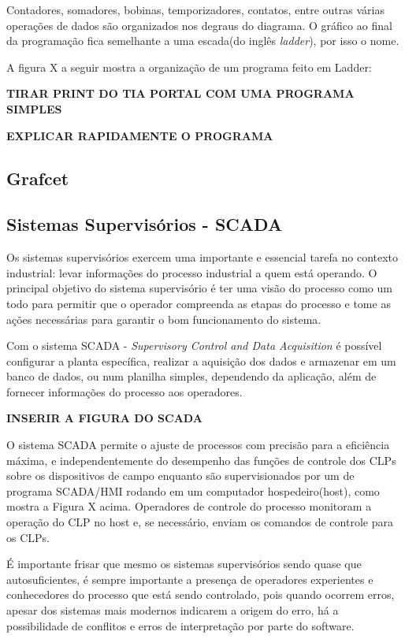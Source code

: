 \documentclass[a4paper, 12pt]{article}
\begin{document}
			Contadores, somadores, bobinas, temporizadores, contatos, entre outras várias
			operações de dados são organizados nos degraus do diagrama.
			O gráfico ao final da programação fica semelhante a uma escada(do inglês \textit{ladder}), por isso o nome.
			
			A figura X a seguir mostra a organização de um programa feito em Ladder:
			
			\textbf{TIRAR PRINT DO TIA PORTAL COM UMA PROGRAMA SIMPLES}
			
			\textbf{EXPLICAR RAPIDAMENTE O PROGRAMA}

	\subsection{Grafcet}

	\subsection{Sistemas Supervisórios - SCADA}
		
		Os sistemas supervisórios exercem uma importante e essencial tarefa no contexto
		industrial: levar informações do processo industrial a quem está operando.
		O principal objetivo do sistema supervisório é ter uma visão do processo como um
		todo para permitir que o operador compreenda as etapas do processo e tome as ações
		necessárias para garantir o bom funcionamento do sistema.
		
		Com o sistema SCADA - \textit{Supervisory Control and Data Acquisition} é possível
		configurar a planta específica, realizar a aquisição dos dados e armazenar em um
		banco de dados, ou num planilha simples, dependendo da aplicação, além de fornecer
		informações do processo aos operadores.
		
		\textbf{INSERIR A FIGURA DO SCADA}
		
		O sistema SCADA permite o ajuste de processos com precisão para a eficiência máxima, e
		independentemente do desempenho das funções de controle dos CLPs sobre os dispositivos
		de campo enquanto são supervisionados por um de programa SCADA/HMI rodando em um computador
		hospedeiro(host), como mostra a Figura X acima. Operadores de controle do processo monitoram
		a operação do CLP no host e, se necessário, enviam os comandos de controle para os CLPs.
		
		É importante frisar que mesmo os sistemas supervisórios sendo quase que autosuficientes, é sempre
		importante a presença de operadores experientes e conhecedores do processo que está sendo controlado,
		pois quando ocorrem erros, apesar dos sistemas mais modernos indicarem a origem do erro, 
		há a possibilidade de conflitos e erros de interpretação por parte do software.
\end{document}

